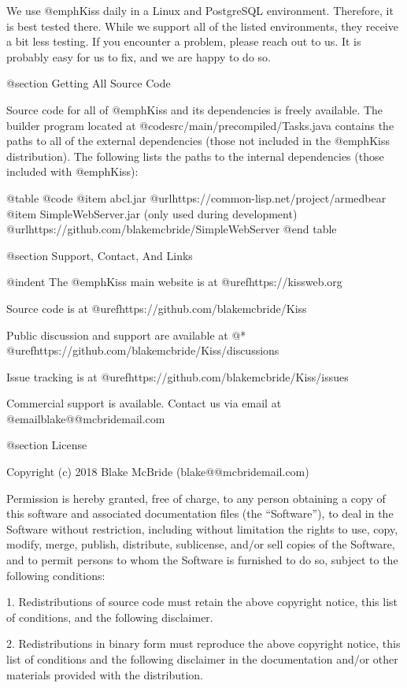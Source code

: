We use @emph{Kiss} daily in a Linux and PostgreSQL environment.
Therefore, it is best tested there.  While we support all of the listed
environments, they receive a bit less testing.  If you encounter a problem,
please reach out to us.  It is probably easy for us to fix, and we
are happy to do so.


@section Getting All Source Code

Source code for all of @emph{Kiss} and its dependencies is freely
available.  The builder program located at
@code{src/main/precompiled/Tasks.java} contains the paths
to all of the external dependencies (those not included in the
@emph{Kiss} distribution).  The following lists the paths to the
internal dependencies (those included with @emph{Kiss}):

@table @code
@item abcl.jar
@url{https://common-lisp.net/project/armedbear}
@item SimpleWebServer.jar (only used during development)
@url{https://github.com/blakemcbride/SimpleWebServer}
@end table

@section Support, Contact, And Links

@indent
The @emph{Kiss} main website is at @uref{https://kissweb.org}

Source code is at @uref{https://github.com/blakemcbride/Kiss}

Public discussion and support are available at @* 
@uref{https://github.com/blakemcbride/Kiss/discussions}

Issue tracking is at @uref{https://github.com/blakemcbride/Kiss/issues}

Commercial support is available.  Contact us via email at @email{blake@@mcbridemail.com}

@section License

Copyright (c) 2018 Blake McBride (blake@@mcbridemail.com)

Permission is hereby granted, free of charge, to any person obtaining
a copy of this software and associated documentation files (the
``Software''), to deal in the Software without restriction, including
without limitation the rights to use, copy, modify, merge, publish,
distribute, sublicense, and/or sell copies of the Software, and to
permit persons to whom the Software is furnished to do so, subject to
the following conditions:

1. Redistributions of source code must retain the above copyright
notice, this list of conditions, and the following disclaimer.

2. Redistributions in binary form must reproduce the above copyright
notice, this list of conditions and the following disclaimer in the
documentation and/or other materials provided with the distribution.

